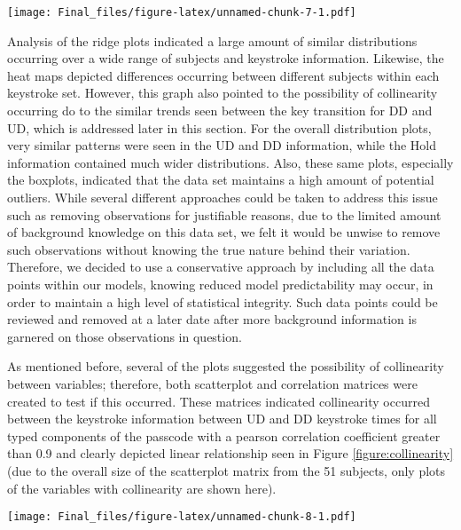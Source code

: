 \documentclass[]{article}
\let\origfigure\figure
\let\endorigfigure\endfigure
\renewenvironment{figure}[1][2] {
    \expandafter\origfigure\expandafter[H]
} {
    \endorigfigure
}
\begin{document}
\begin{figure}
\centering
\texttt{[image: Final\_files/figure-latex/unnamed-chunk-7-1.pdf]}
\caption{Ridgle plot, violin plot, and barplot of depicting overall
distribution of Up-Down keystroke information.
\label{figure:overall-distribution-UD}}
\end{figure}

Analysis of the ridge plots indicated a large amount of similar
distributions occurring over a wide range of subjects and keystroke
information. Likewise, the heat maps depicted differences occurring
between different subjects within each keystroke set. However, this
graph also pointed to the possibility of collinearity occurring do to
the similar trends seen between the key transition for DD and UD, which
is addressed later in this section. For the overall distribution plots,
very similar patterns were seen in the UD and DD information, while the
Hold information contained much wider distributions. Also, these same
plots, especially the boxplots, indicated that the data set maintains a
high amount of potential outliers. While several different approaches
could be taken to address this issue such as removing observations for
justifiable reasons, due to the limited amount of background knowledge
on this data set, we felt it would be unwise to remove such observations
without knowing the true nature behind their variation. Therefore, we
decided to use a conservative approach by including all the data points
within our models, knowing reduced model predictability may occur, in
order to maintain a high level of statistical integrity. Such data
points could be reviewed and removed at a later date after more
background information is garnered on those observations in question.

As mentioned before, several of the plots suggested the possibility of
collinearity between variables; therefore, both scatterplot and
correlation matrices were created to test if this occurred. These
matrices indicated collinearity occurred between the keystroke
information between UD and DD keystroke times for all typed components
of the passcode with a pearson correlation coefficient greater than 0.9
and clearly depicted linear relationship seen in Figure
\ref{figure:collinearity} (due to the overall size of the scatterplot
matrix from the 51 subjects, only plots of the variables with
collinearity are shown here).

\begin{figure}
\centering
\texttt{[image: Final\_files/figure-latex/unnamed-chunk-8-1.pdf]}
\caption{Scatterplot matrix between Down-Down and Up-Down keystroke
infomation for all variables showing collinearity.
\label{figure:collinearity}}
\end{figure}
\end{document}
